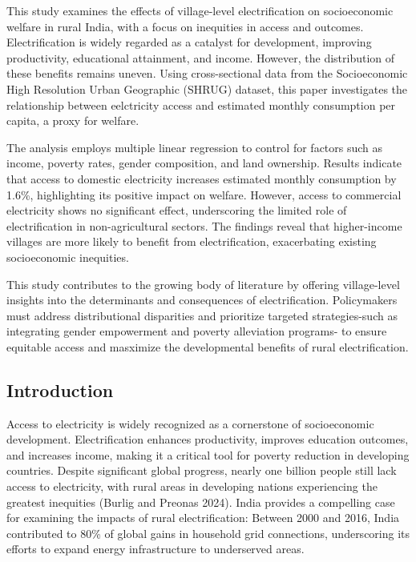 \documentclass[
]{article}
\begin{document}
This study examines the effects of village-level electrification on
socioeconomic welfare in rural India, with a focus on inequities in
access and outcomes. Electrification is widely regarded as a catalyst
for development, improving productivity, educational attainment, and
income. However, the distribution of these benefits remains uneven.
Using cross-sectional data from the Socioeconomic High Resolution Urban
Geographic (SHRUG) dataset, this paper investigates the relationship
between eelctricity access and estimated monthly consumption per capita,
a proxy for welfare.

The analysis employs multiple linear regression to control for factors
such as income, poverty rates, gender composition, and land ownership.
Results indicate that access to domestic electricity increases estimated
monthly consumption by 1.6\%, highlighting its positive impact on
welfare. However, access to commercial electricity shows no significant
effect, underscoring the limited role of electrification in
non-agricultural sectors. The findings reveal that higher-income
villages are more likely to benefit from electrification, exacerbating
existing socioeconomic inequities.

This study contributes to the growing body of literature by offering
village-level insights into the determinants and consequences of
electrification. Policymakers must address distributional disparities
and prioritize targeted strategies-such as integrating gender
empowerment and poverty alleviation programs- to ensure equitable access
and masximize the developmental benefits of rural electrification.

\newpage

\hypertarget{introduction}{%
\subsection{Introduction}\label{introduction}}

Access to electricity is widely recognized as a cornerstone of
socioeconomic development. Electrification enhances productivity,
improves education outcomes, and increases income, making it a critical
tool for poverty reduction in developing countries. Despite significant
global progress, nearly one billion people still lack access to
electricity, with rural areas in developing nations experiencing the
greatest inequities (Burlig and Preonas 2024). India provides a
compelling case for examining the impacts of rural electrification:
Between 2000 and 2016, India contributed to 80\% of global gains in
household grid connections, underscoring its efforts to expand energy
infrastructure to underserved areas.
\end{document}
